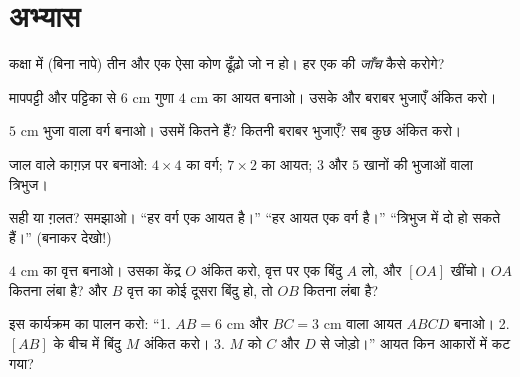 \section{अभ्यास}

\begin{exercise}[$\star$]\label{exo:g3:shapes:1}
कक्षा में (बिना नापे) तीन  और एक ऐसा कोण ढूँढ़ो जो 
न हो। हर एक की \emph{जाँच} कैसे करोगे?
\end{exercise}

\begin{exercise}[$\star$]\label{exo:g3:shapes:2}
मापपट्टी और  पट्टिका से $6$ cm गुणा $4$ cm का आयत बनाओ।
उसके  और बराबर भुजाएँ अंकित करो।
\end{exercise}

\begin{exercise}[$\star$]\label{exo:g3:shapes:3}
$5$ cm भुजा वाला वर्ग बनाओ। उसमें कितने  हैं?
कितनी बराबर भुजाएँ? सब कुछ अंकित करो।
\end{exercise}

\begin{exercise}[$\star$]\label{exo:g3:shapes:4}
जाल वाले काग़ज़ पर बनाओ: $4 \times 4$ का वर्ग; $7 \times 2$
का आयत; $3$ और $5$ खानों की भुजाओं वाला  त्रिभुज।
\end{exercise}

\begin{exercise}[$\star$]\label{exo:g3:shapes:5}
सही या ग़लत? समझाओ।
``हर वर्ग एक आयत है।'' \quad
``हर आयत एक वर्ग है।'' \quad
``त्रिभुज में दो  हो सकते हैं।'' (बनाकर देखो!)
\end{exercise}

\begin{exercise}[$\star$]\label{exo:g3:shapes:6}
$4$ cm  का वृत्त बनाओ। उसका केंद्र $O$ अंकित करो, वृत्त
पर एक बिंदु $A$ लो, और  $[OA]$ खींचो। $OA$ कितना लंबा
है? और $B$ वृत्त का कोई दूसरा बिंदु हो, तो $OB$ कितना लंबा है?
\end{exercise}

\begin{exercise}[$\star$]\label{exo:g3:shapes:7}
इस कार्यक्रम का पालन करो: ``1. $AB = 6$ cm और $BC = 3$ cm
वाला आयत $ABCD$ बनाओ। 2. $[AB]$ के बीच में बिंदु $M$ अंकित करो।
3. $M$ को $C$ और $D$ से जोड़ो।'' आयत किन आकारों में कट
गया?
\end{exercise}

